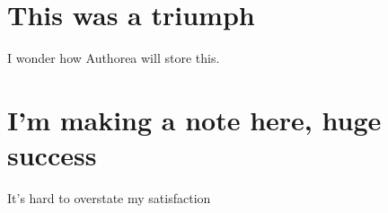 \section{This was a triumph}

I wonder how Authorea will store this.

\section{I'm making a note here, huge success}

It's hard to overstate my satisfaction